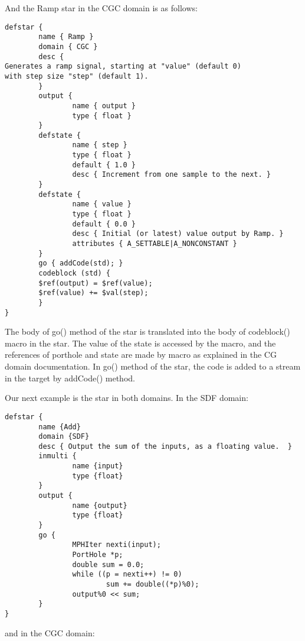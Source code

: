 And the Ramp star in the CGC domain is as follows:

\begin{verbatim}
defstar {
        name { Ramp }
        domain { CGC }
        desc {
Generates a ramp signal, starting at "value" (default 0)
with step size "step" (default 1).
        }
        output {
                name { output }
                type { float }
        }
        defstate {
                name { step }
                type { float }
                default { 1.0 }
                desc { Increment from one sample to the next. }
        }
        defstate {
                name { value }
                type { float }
                default { 0.0 }
                desc { Initial (or latest) value output by Ramp. }
                attributes { A_SETTABLE|A_NONCONSTANT }
        }
        go { addCode(std); }
        codeblock (std) {
        $ref(output) = $ref(value);
        $ref(value) += $val(step);
        }
}
\end{verbatim}

 The body of go() method of the
star is translated into the body of codeblock() macro in the
star.
 The value of the state
is accessed by the  macro, and the references of porthole
and state
are made by
macro as explained in the CG domain documentation.
 In go() method of the
star, the code is added to a stream in the target by addCode() method.

 Our next example is the
star in both domains.
 In the SDF domain:

\begin{verbatim}
defstar {
        name {Add}
        domain {SDF}
        desc { Output the sum of the inputs, as a floating value.  }
        inmulti {
                name {input}
                type {float}
        }
        output {
                name {output}
                type {float}
        }
        go {
                MPHIter nexti(input);
                PortHole *p;
                double sum = 0.0;
                while ((p = nexti++) != 0)
                        sum += double((*p)%0);
                output%0 << sum;
        }
}
\end{verbatim}

and in the CGC domain:

